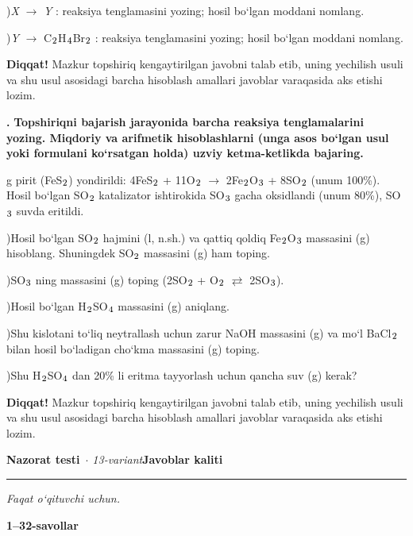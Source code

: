\documentclass[11pt,a4paper]{article}
\renewcommand{\textsubscript}[1]{\ensuremath{_{\text{\fontsize{8}{8}\selectfont #1}}}}
\newcommand{\qn}[1]{\textbf{\fontsize{11.5}{13}\selectfont #1}}
\newcommand{\qsep}{\par\vspace{1pt}\noindent\rule{0pt}{0.4pt}\par\vspace{5pt}}
\newcommand{\diqqat}[1]{\par\smallskip\noindent\textbf{Diqqat!} #1\par\medskip}
\begin{document}
)\textit{X} $\to$ \textit{Y} : reaksiya tenglamasini yozing; hosil bo`lgan moddani nomlang.\par
{})\textit{Y} $\to$ C\textsubscript{2}H\textsubscript{4}Br\textsubscript{2} : reaksiya tenglamasini yozing; hosil bo`lgan moddani nomlang.\par
\diqqat{Mazkur topshiriq kengaytirilgan javobni talab etib, uning yechilish usuli va shu usul asosidagi barcha hisoblash amallari javoblar varaqasida aks etishi lozim.}\qsep
\noindent\qn{43.} \textbf{Topshiriqni bajarish jarayonida barcha reaksiya tenglamalarini yozing. Miqdoriy va arifmetik hisoblashlarni (unga asos bo`lgan usul yoki formulani ko`rsatgan holda) uzviy ketma-ketlikda bajaring.}\par{} g pirit (FeS\textsubscript{2}) yondirildi: 4FeS\textsubscript{2} + 11O\textsubscript{2} $\to$ 2Fe\textsubscript{2}O\textsubscript{3} + 8SO\textsubscript{2} (unum 100\%). Hosil bo`lgan SO\textsubscript{2} katalizator ishtirokida SO\textsubscript{3} gacha oksidlandi (unum 80\%), SO\textsubscript{3} suvda eritildi.\par
{})Hosil bo`lgan SO\textsubscript{2} hajmini (l, n.sh.) va qattiq qoldiq Fe\textsubscript{2}O\textsubscript{3} massasini (g) hisoblang. Shuningdek SO\textsubscript{2} massasini (g) ham toping.\par
{})SO\textsubscript{3} ning massasini (g) toping (2SO\textsubscript{2} + O\textsubscript{2} $\rightleftarrows$ 2SO\textsubscript{3}).\par
{})Hosil bo`lgan H\textsubscript{2}SO\textsubscript{4} massasini (g) aniqlang.\par
{})Shu kislotani to`liq neytrallash uchun zarur NaOH massasini (g) va mo`l BaCl\textsubscript{2} bilan hosil bo`ladigan cho`kma massasini (g) toping.\par
{})Shu H\textsubscript{2}SO\textsubscript{4} dan 20\% li eritma tayyorlash uchun qancha suv (g) kerak?\par
\diqqat{Mazkur topshiriq kengaytirilgan javobni talab etib, uning yechilish usuli va shu usul asosidagi barcha hisoblash amallari javoblar varaqasida aks etishi lozim.}\qsep
\newpage
\noindent\textbf{\fontsize{13}{15}\selectfont Nazorat testi}\ \textit{$\cdot$ 13-variant}\hfill \textbf{Javoblar kaliti}\par\smallskip\hrule\smallskip
\textit{Faqat o`qituvchi uchun.}\par\medskip
\noindent\textbf{1--32-savollar}\par\smallskip
\end{document}
